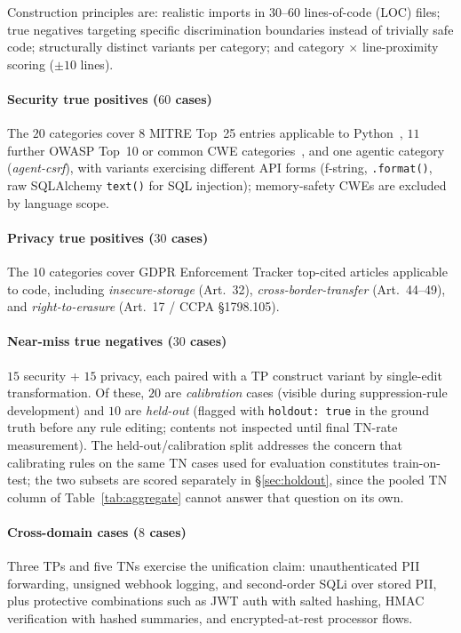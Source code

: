 \documentclass[runningheads]{llncs}
\begin{document}
Construction principles are: realistic imports in $30$--$60$ lines-of-code (LOC) files; true negatives targeting specific discrimination boundaries instead of trivially safe code; structurally distinct variants per category; and category $\times$ line-proximity scoring ($\pm 10$ lines).

\paragraph{Security true positives ($60$ cases)} The $20$ categories cover $8$ MITRE Top~25 entries applicable to Python~\cite{mitre2025top25}, $11$ further OWASP Top~10 or common CWE categories~\cite{owasp2021}, and one agentic category (\emph{agent-csrf}), with variants exercising different API forms (f-string, \texttt{.format()}, raw SQLAlchemy \texttt{text()} for SQL injection); memory-safety CWEs are excluded by language scope.

\paragraph{Privacy true positives ($30$ cases)} The $10$ categories cover GDPR Enforcement Tracker top-cited articles applicable to code, including \emph{insecure-storage} (Art.~32), \emph{cross-border-transfer} (Art.~44--49), and \emph{right-to-erasure} (Art.~17 / CCPA \S1798.105).

\paragraph{Near-miss true negatives ($30$ cases)} $15$ security + $15$ privacy, each paired with a TP construct variant by single-edit transformation. Of these, $20$ are \emph{calibration} cases (visible during suppression-rule development) and $10$ are \emph{held-out} (flagged with \texttt{holdout:~true} in the ground truth before any rule editing; contents not inspected until final TN-rate measurement). The held-out/calibration split addresses the concern that calibrating rules on the same TN cases used for evaluation constitutes train-on-test; the two subsets are scored separately in \S\ref{sec:holdout}, since the pooled TN column of Table~\ref{tab:aggregate} cannot answer that question on its own.

\paragraph{Cross-domain cases ($8$ cases)} Three TPs and five TNs exercise the unification claim: unauthenticated PII forwarding, unsigned webhook logging, and second-order SQLi over stored PII, plus protective combinations such as JWT auth with salted hashing, HMAC verification with hashed summaries, and encrypted-at-rest processor flows.
\end{document}

